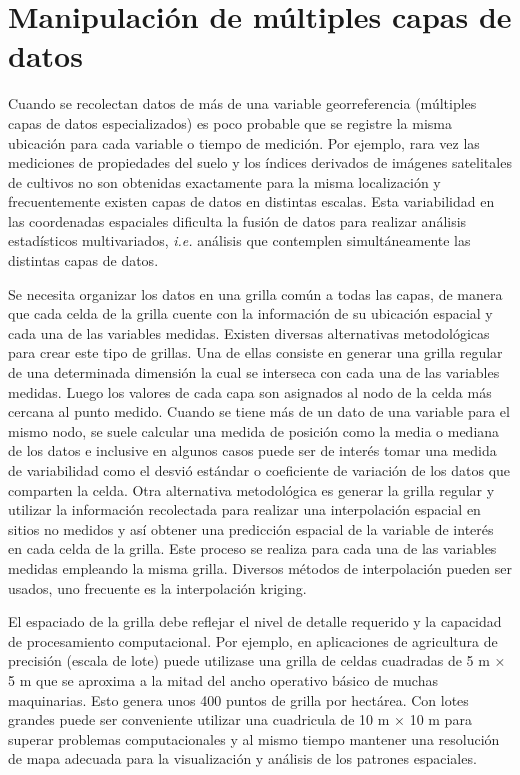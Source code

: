 \documentclass[11pt,b5paper,]{krantz}
\begin{document}
\section{Manipulación de múltiples capas de
datos}\label{manipulaciuxf3n-de-muxfaltiples-capas-de-datos}

Cuando se recolectan datos de más de una variable georreferencia
(múltiples capas de datos especializados) es poco probable que se
registre la misma ubicación para cada variable o tiempo de medición. Por
ejemplo, rara vez las mediciones de propiedades del suelo y los índices
derivados de imágenes satelitales de cultivos no son obtenidas
exactamente para la misma localización y frecuentemente existen capas de
datos en distintas escalas. Esta variabilidad en las coordenadas
espaciales dificulta la fusión de datos para realizar análisis
estadísticos multivariados, \emph{i.e.} análisis que contemplen
simultáneamente las distintas capas de datos.

Se necesita organizar los datos en una grilla común a todas las capas,
de manera que cada celda de la grilla cuente con la información de su
ubicación espacial y cada una de las variables medidas. Existen diversas
alternativas metodológicas para crear este tipo de grillas. Una de ellas
consiste en generar una grilla regular de una determinada dimensión la
cual se interseca con cada una de las variables medidas. Luego los
valores de cada capa son asignados al nodo de la celda más cercana al
punto medido. Cuando se tiene más de un dato de una variable para el
mismo nodo, se suele calcular una medida de posición como la media o
mediana de los datos e inclusive en algunos casos puede ser de interés
tomar una medida de variabilidad como el desvió estándar o coeficiente
de variación de los datos que comparten la celda. Otra alternativa
metodológica es generar la grilla regular y utilizar la información
recolectada para realizar una interpolación espacial en sitios no
medidos y así obtener una predicción espacial de la variable de interés
en cada celda de la grilla. Este proceso se realiza para cada una de las
variables medidas empleando la misma grilla. Diversos métodos de
interpolación pueden ser usados, uno frecuente es la interpolación
kriging.

El espaciado de la grilla debe reflejar el nivel de detalle requerido y
la capacidad de procesamiento computacional. Por ejemplo, en
aplicaciones de agricultura de precisión (escala de lote) puede
utilizase una grilla de celdas cuadradas de 5 m × 5 m que se aproxima a
la mitad del ancho operativo básico de muchas maquinarias. Esto genera
unos 400 puntos de grilla por hectárea. Con lotes grandes puede ser
conveniente utilizar una cuadricula de 10 m × 10 m para superar
problemas computacionales y al mismo tiempo mantener una resolución de
mapa adecuada para la visualización y análisis de los patrones
espaciales.
\end{document}

